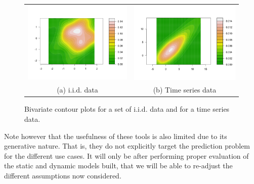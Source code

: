 \begin{figure}
\begin{center}
\begin{tabular}{cc}
\includegraphics[scale=0.25]{./figures/BivariateGaussian} &
\includegraphics[scale=0.25]{./figures/BivariateTimeSerie} \\
(a) i.i.d. data & (b)  Time series data \\
\end{tabular}
\caption{\label{Figure:PreliminariesBivariates}Bivariate contour plots for a set of i.i.d. data and for a time series data. 
}
\end{center}
\end{figure}

Note however that the usefulness of these tools is also limited due to its generative nature. That is, they do not explicitly target the prediction problem for the different use cases. It will only be after performing proper evaluation of the static and dynamic models built, that we will be able to re-adjust the different assumptions now considered. 
